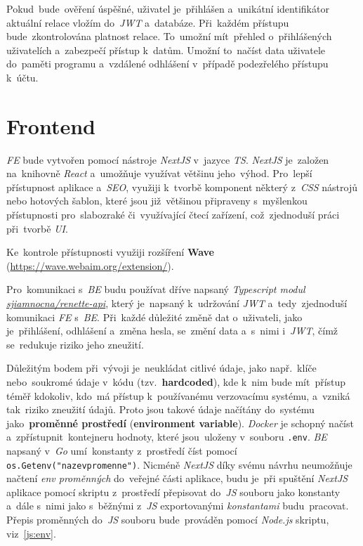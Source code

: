 \documentclass[11pt,a4paper]{report}
\let\oldacrshort\acrshort
\renewcommand{\acrshort}[1]{\emph{\normalsize\color[rgb]{0,0,0}\noindent\oldacrshort{#1}}}
\begin{document}
            Pokud~bude~ověření úspěšné, uživatel je~přihlášen a~unikátní identifikátor aktuální relace vložím do~\acrshort{JWT} a~databáze. Při~každém přístupu bude~zkontrolována platnost relace. To~umožní mít~přehled o~přihlášených uživatelích a~zabezpečí přístup k~datům. Umožní to~načíst data uživatele do~paměti programu a~vzdálené odhlášení v~případě podezřelého přístupu k~účtu.

        \section{Frontend}
            \acrshort{FE} bude vytvořen pomocí nástroje \emph{NextJS} v~jazyce \acrshort{TS}. \emph{NextJS} je~založen na~knihovně \emph{React} a~umožňuje využívat většinu jeho~výhod. Pro~lepší přístupnost aplikace a~\acrshort{SEO}, využiji k~tvorbě komponent některý z~\acrshort{CSS} nástrojů nebo hotových šablon, které jsou již~většinou připraveny s~myšlenkou přístupnosti pro~slabozraké či~využívající čtecí zařízení, což~zjednoduší práci při~tvorbě \acrshort{UI}.

            Ke~kontrole přístupnosti využiji rozšíření \textbf{Wave} (\url{https://wave.webaim.org/extension/}).

            Pro~komunikaci s~\acrshort{BE} budu používat dříve napsaný \emph{Typescript modul} \href{https://gitlab.com/sjiamnocna/renette-api}{\emph{sjiamnocna/renette-api}}, který je~napsaný k~udržování \acrshort{JWT} a~tedy~zjednoduší komunikaci \acrshort{FE} s~\acrshort{BE}. Při~každé důležité změně dat o~uživateli, jako je~přihlášení, odhlášení a~změna hesla, se~změní data a~s~nimi i~\acrshort{JWT}, čímž se~redukuje riziko jeho zneužití.

            Důležitým bodem při~vývoji je~neukládat citlivé údaje, jako např.~klíče nebo~soukromé údaje v~kódu (tzv.~\textbf{hardcoded}), kde k~nim bude mít~přístup téměř kdokoliv, kdo~má přístup k~používanému verzovacímu systému, a~vzniká tak~riziko zneužití údajů. Proto jsou takové údaje načítány do~systému jako~\textbf{proměnné prostředí} (\textbf{environment variable}). \emph{Docker} je schopný načíst a~zpřístupnit~kontejneru hodnoty, které jsou~uloženy v~souboru \texttt{.env}. \acrshort{BE} napsaný v~\emph{Go} umí~konstanty z~prostředí číst pomocí \texttt{os.Getenv("nazevpromenne")}. Nicméně \emph{NextJS} díky svému návrhu neumožňuje načtení \emph{env proměnných} do~veřejné části aplikace, budu je~při spuštění \emph{NextJS} aplikace pomocí skriptu z~prostředí přepisovat do~\acrshort{JS} souboru jako konstanty a~dále s~nimi jako s~běžnými z~\acrshort{JS} exportovanými \emph{konstantami} budu~pracovat. Přepis proměnných do~\acrshort{JS} souboru bude~prováděn pomocí \emph{Node.js} skriptu, viz~\ref{js:env}.
            
\end{document}
